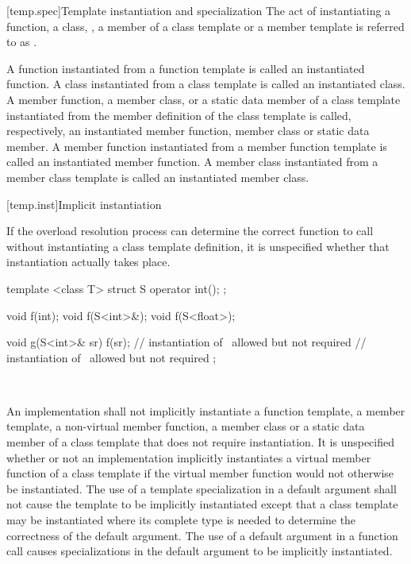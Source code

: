 \documentclass[american]{book}
\begin{document}
\begin{paras}
[temp.spec]{Template instantiation and specialization}
\pnum
{}%
The act of instantiating a function, a class, , a member of a class template or
a member template is referred to as
.

\pnum
A function instantiated from a function template is called an instantiated
function.
A class instantiated from a class template is called an instantiated
class.
A member function, a member class, or a static data member of a class template
instantiated from the member definition of the class template is called,
respectively, an instantiated member function, member class or static data
member.
A member function instantiated from a member function template is called an
instantiated member function.
A member class instantiated from a member class template is called an
instantiated member class.

[temp.inst]{Implicit instantiation}

\setcounter{Paras}{4}
\pnum
If the overload resolution process can determine the correct function to
call without instantiating a class template definition, it is unspecified
whether that instantiation actually takes place.
\enterexample\ 

\begin{codeblock}
template <class T> struct S {
  operator int();
};

void f(int);
void f(S<int>&);
void f(S<float>);

void g(S<int>& sr) {
  f(sr);                  // instantiation of \ allowed but not required
        // instantiation of \ allowed but not required
};
\end{codeblock}
\exitexample\ 

\setcounter{Paras}{8}
\textcolor{black}{\pnum}
An implementation shall not implicitly instantiate a function template,
a member template, a non-virtual member function,
 a member class or a
static data member of a class template that does not require instantiation.
It is unspecified whether or not an implementation implicitly instantiates a
virtual member function of a class template if the virtual member function would
not otherwise be instantiated.
The use of a template specialization in a default argument
shall not cause the template to be implicitly instantiated except that a
class template may be instantiated where its complete type is needed to determine
the correctness of the default argument.
The use of a default argument in a
function call causes specializations in the default argument to be implicitly
instantiated.


\end{paras}
\end{document}
